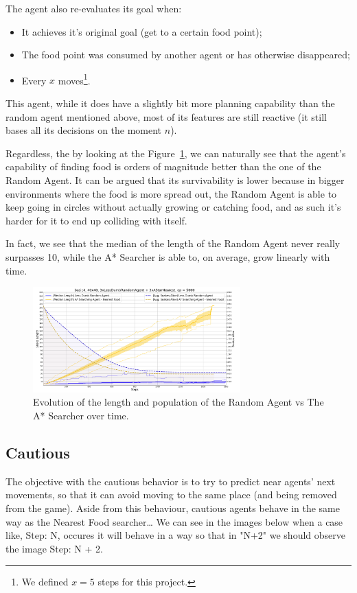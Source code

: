 The agent also re-evaluates its goal when:
\begin{itemize}
  \item It achieves it's original goal (get to a certain food point);
  \item The food point was consumed by another agent or has otherwise disappeared;
  \item Every $x$ moves\footnote{We defined $x = 5$ steps for this project.}.
\end{itemize}

This agent, while it does have a slightly bit more planning capability than the random agent mentioned above, most of its features are still reactive
(it still bases all its decisions on the moment $n$).

Regardless, the by looking at the Figure~\ref{fig_plot_basic4}, we can naturally see that the agent's capability of finding food is orders of magnitude better
than the one of the Random Agent. It can be argued that its survivability is lower because in bigger environments where the food is more spread out,
the Random Agent is able to keep going in circles without actually growing or catching food, and as such it's harder for it to end up colliding with itself.

In fact, we see that the median of the length of the Random Agent never really surpasses 10, while the A* Searcher is able to, on average, grow linearly with time.

\begin{figure}
\includegraphics[height=1.6in]{plot_basic4}
\caption{Evolution of the length and population of the Random Agent vs The A* Searcher over time.}
\label{fig_plot_basic4}
\end{figure}

\subsection{Cautious}

The objective with the cautious behavior is to try to predict near agents' next movements,
so that it can avoid moving to the same place (and being removed from the game).
Aside from this behaviour, cautious agents behave in the same way as the Nearest Food searcher\dots
We can see in the images below when a case like, Step: N, occures it will behave in a way so that in "N+2" we should observe the image Step: N + 2.

